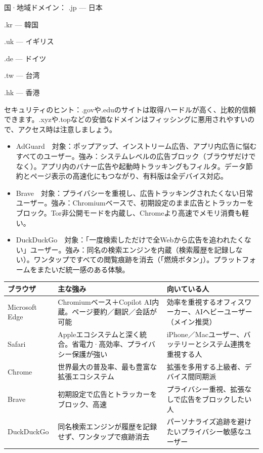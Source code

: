 国·地域ドメイン： .jp — 日本

.kr — 韓国

.uk — イギリス

.de — ドイツ

.tw — 台湾

.hk — 香港

セキュリティのヒント：.govや.eduのサイトは取得ハードルが高く、比較的信頼できます。.xyzや.topなどの安価なドメインはフィッシングに悪用されやすいので、アクセス時は注意しましょう。


\begin{itemize}
  \item AdGuard　対象：ポップアップ、インストリーム広告、アプリ内広告に悩むすべてのユーザー。強み：システムレベルの広告ブロック（ブラウザだけでなく）。アプリ内のバナー広告や起動時トラッキングもフィルタ。データ節約とページ表示の高速化にもつながり、有料版は全デバイス対応。
\end{itemize}


\begin{itemize}
  \item Brave　対象：プライバシーを重視し、広告トラッキングされたくない日常ユーザー。強み：Chromiumベースで、初期設定のまま広告とトラッカーをブロック。Tor非公開モードを内蔵し、Chromeより高速でメモリ消費も軽い。
  \item DuckDuckGo　対象：「一度検索しただけで全Webから広告を追われたくない」ユーザー。強み：同名の検索エンジンを内蔵（検索履歴を記録しない）。ワンタップですべての閲覧痕跡を消去（「燃焼ボタン」）。プラットフォームをまたいだ統一感のある体験。
\end{itemize}


\begin{center}
\begin{tabularx}{\linewidth}{|X|X|X|}
\hline
\textbf{ブラウザ} & \textbf{主な強み} & \textbf{向いている人} \tabularnewline
\hline
Microsoft Edge & Chromiumベース＋Copilot AI内蔵。ページ要約／翻訳／会話が可能 & 効率を重視するオフィスワーカー、AIヘビーユーザー（メイン推奨） \tabularnewline
Safari & Appleエコシステムと深く統合。省電力·高効率、プライバシー保護が強い & iPhone／Macユーザー、バッテリーとシステム連携を重視する人 \tabularnewline
Chrome & 世界最大の普及率、最も豊富な拡張エコシステム & 拡張を多用する上級者、デバイス間同期派 \tabularnewline
Brave & 初期設定で広告とトラッカーをブロック、高速 & プライバシー重視、拡張なしで広告をブロックしたい人 \tabularnewline
DuckDuckGo & 同名検索エンジンが履歴を記録せず、ワンタップで痕跡消去 & パーソナライズ追跡を避けたいプライバシー敏感なユーザー \tabularnewline
\hline
\end{tabularx}
\end{center}

